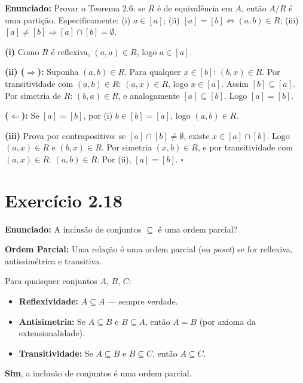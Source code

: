 \documentclass[12pt,a4paper]{article}
\begin{document}
\textbf{Enunciado:} Provar o Teorema 2.6: se $R$ é de equivalência em $A$, então $A/R$ é uma partição. Especificamente: (i) $a \in [a]$; (ii) $[a] = [b] \Leftrightarrow (a,b) \in R$; (iii) $[a] \neq [b] \Rightarrow [a] \cap [b] = \emptyset$.

\textbf{(i)} Como $R$ é reflexiva, $(a,a) \in R$, logo $a \in [a]$.

\textbf{(ii) ($\Rightarrow$):} Suponha $(a,b) \in R$. Para qualquer $x \in [b]$: $(b,x) \in R$. Por transitividade com $(a,b) \in R$: $(a,x) \in R$, logo $x \in [a]$. Assim $[b] \subseteq [a]$. Por simetria de $R$: $(b,a) \in R$, e analogamente $[a] \subseteq [b]$. Logo $[a] = [b]$.

\textbf{($\Leftarrow$):} Se $[a] = [b]$, por (i) $b \in [b] = [a]$, logo $(a,b) \in R$.

\textbf{(iii)} Prova por contrapositivo: se $[a] \cap [b] \neq \emptyset$, existe $x \in [a] \cap [b]$. Logo $(a,x) \in R$ e $(b,x) \in R$. Por simetria $(x,b) \in R$, e por transitividade com $(a,x) \in R$: $(a,b) \in R$. Por (ii), $[a] = [b]$. \hfill$\square$

\section*{Exercício 2.18}

\textbf{Enunciado:} A inclusão de conjuntos $\subseteq$ é uma ordem parcial?

\begin{teoribox}
\textbf{Ordem Parcial:} Uma relação é uma ordem parcial (ou \emph{poset}) se for reflexiva, antissimétrica e transitiva.
\end{teoribox}

Para quaisquer conjuntos $A$, $B$, $C$:
\begin{itemize}
  \item \textbf{Reflexividade:} $A \subseteq A$ --- sempre verdade.
  \item \textbf{Antisimetria:} Se $A \subseteq B$ e $B \subseteq A$, então $A = B$ (por axioma da extensionalidade).
  \item \textbf{Transitividade:} Se $A \subseteq B$ e $B \subseteq C$, então $A \subseteq C$.
\end{itemize}
\textbf{Sim}, a inclusão de conjuntos é uma ordem parcial.

\end{document}
